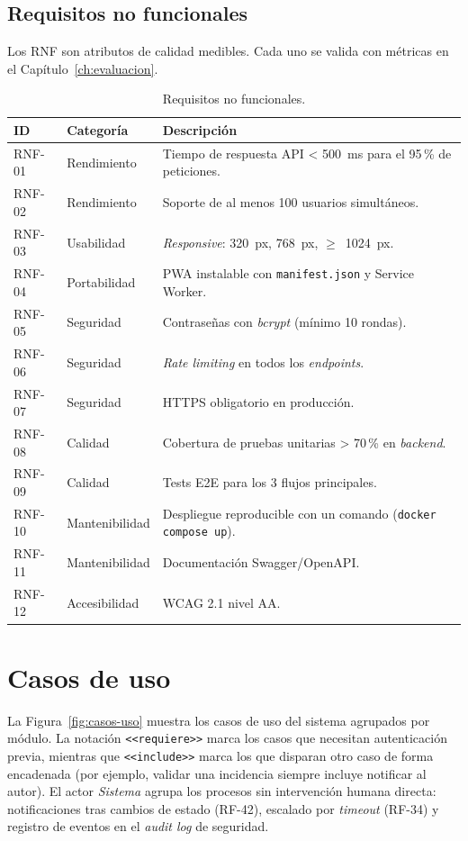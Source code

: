 \subsection{Requisitos no funcionales}
\label{subsec:rnf}

Los RNF son atributos de calidad medibles. Cada uno se valida con métricas en el Capítulo~\ref{ch:evaluacion}.

\begin{table}[H]
\centering
\caption{Requisitos no funcionales.}
\label{tab:rnf}
\small
\begin{tabular}{@{}L{1.3cm}L{2.8cm}L{9cm}@{}}
\toprule
\textbf{ID} & \textbf{Categoría} & \textbf{Descripción} \\
\midrule
RNF-01 & Rendimiento    & Tiempo de respuesta API < 500~ms para el 95\,\% de peticiones. \\
RNF-02 & Rendimiento    & Soporte de al menos 100 usuarios simultáneos. \\
RNF-03 & Usabilidad     & \textit{Responsive}: 320~px, 768~px, $\geq$~1024~px. \\
RNF-04 & Portabilidad   & PWA instalable con \texttt{manifest.json} y Service Worker. \\
RNF-05 & Seguridad      & Contraseñas con \textit{bcrypt} (mínimo 10 rondas). \\
RNF-06 & Seguridad      & \textit{Rate limiting} en todos los \textit{endpoints}. \\
RNF-07 & Seguridad      & HTTPS obligatorio en producción. \\
RNF-08 & Calidad        & Cobertura de pruebas unitarias > 70\,\% en \textit{backend}. \\
RNF-09 & Calidad        & Tests E2E para los 3 flujos principales. \\
RNF-10 & Mantenibilidad & Despliegue reproducible con un comando (\texttt{docker compose up}). \\
RNF-11 & Mantenibilidad & Documentación Swagger/OpenAPI. \\
RNF-12 & Accesibilidad  & WCAG 2.1 nivel AA. \\
\bottomrule
\end{tabular}
\end{table}


\section{Casos de uso}
\label{sec:casos-uso}

La Figura~\ref{fig:casos-uso} muestra los casos de uso del sistema agrupados por módulo. La notación \texttt{<<requiere>>} marca los casos que necesitan autenticación previa, mientras que \texttt{<<include>>} marca los que disparan otro caso de forma encadenada (por ejemplo, validar una incidencia siempre incluye notificar al autor). El actor \textit{Sistema} agrupa los procesos sin intervención humana directa: notificaciones tras cambios de estado (RF-42), escalado por \textit{timeout} (RF-34) y registro de eventos en el \textit{audit log} de seguridad.

